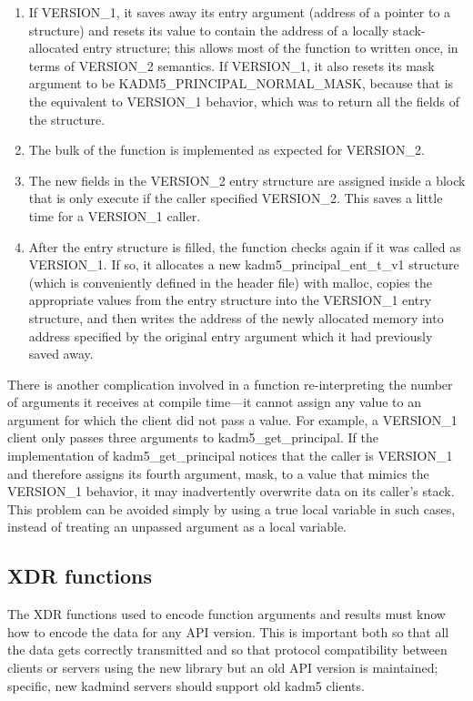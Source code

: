 \begin{enumerate}
\item If VERSION_1, it saves away its entry argument (address of a
pointer to a structure) and resets its value to contain the address of
a locally stack-allocated entry structure; this allows most of the
function to written once, in terms of VERSION_2 semantics.  If
VERSION_1, it also resets its mask argument to be
KADM5_PRINCIPAL_NORMAL_MASK, because that is the equivalent to
VERSION_1 behavior, which was to return all the fields of the
structure.

\item The bulk of the function is implemented as expected for
VERSION_2.

\item The new fields in the VERSION_2 entry structure are assigned
inside a block that is only execute if the caller specified
VERSION_2.  This saves a little time for a VERSION_1 caller.

\item After the entry structure is filled, the function checks again
if it was called as VERSION_1.  If so, it allocates a new
kadm5_principal_ent_t_v1 structure (which is conveniently defined in
the header file) with malloc, copies the appropriate values from the
entry structure into the VERSION_1 entry structure, and then writes
the address of the newly allocated memory into address specified by
the original entry argument which it had previously saved away.
\end{enumerate}

There is another complication involved in a function re-interpreting
the number of arguments it receives at compile time---it cannot assign
any value to an argument for which the client did not pass a value.
For example, a VERSION_1 client only passes three arguments to
kadm5_get_principal.  If the implementation of kadm5_get_principal
notices that the caller is VERSION_1 and therefore assigns its fourth
argument, mask, to a value that mimics the VERSION_1 behavior, it may
inadvertently overwrite data on its caller's stack.  This problem can
be avoided simply by using a true local variable in such cases,
instead of treating an unpassed argument as a local variable.

\subsection{XDR functions}

The XDR functions used to encode function arguments and results must
know how to encode the data for any API version.  This is important
both so that all the data gets correctly transmitted and so that
protocol compatibility between clients or servers using the new
library but an old API version is maintained; specific, new kadmind
servers should support old kadm5 clients.

